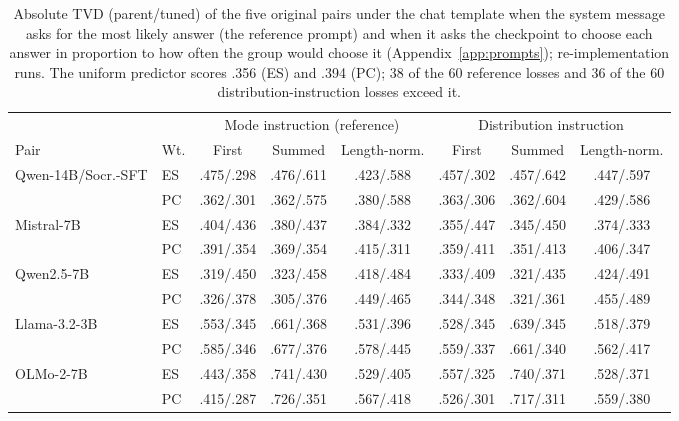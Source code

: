 \begin{table}[t]
\centering\scriptsize
\setlength{\tabcolsep}{4pt}
\begin{tabular}{@{}llcccccc@{}}
\toprule
& & \multicolumn{3}{c}{Mode instruction (reference)} & \multicolumn{3}{c}{Distribution instruction} \\
\cmidrule(lr){3-5}\cmidrule(l){6-8}
Pair & Wt. & First & Summed & Length-norm. & First & Summed & Length-norm. \\
\midrule
Qwen-14B/Socr.-SFT & ES & .475/.298 & .476/.611 & .423/.588 & .457/.302 & .457/.642 & .447/.597 \\
 & PC & .362/.301 & .362/.575 & .380/.588 & .363/.306 & .362/.604 & .429/.586 \\
Mistral-7B & ES & .404/.436 & .380/.437 & .384/.332 & .355/.447 & .345/.450 & .374/.333 \\
 & PC & .391/.354 & .369/.354 & .415/.311 & .359/.411 & .351/.413 & .406/.347 \\
Qwen2.5-7B & ES & .319/.450 & .323/.458 & .418/.484 & .333/.409 & .321/.435 & .424/.491 \\
 & PC & .326/.378 & .305/.376 & .449/.465 & .344/.348 & .321/.361 & .455/.489 \\
Llama-3.2-3B & ES & .553/.345 & .661/.368 & .531/.396 & .528/.345 & .639/.345 & .518/.379 \\
 & PC & .585/.346 & .677/.376 & .578/.445 & .559/.337 & .661/.340 & .562/.417 \\
OLMo-2-7B & ES & .443/.358 & .741/.430 & .529/.405 & .557/.325 & .740/.371 & .528/.371 \\
 & PC & .415/.287 & .726/.351 & .567/.418 & .526/.301 & .717/.311 & .559/.380 \\
\bottomrule
\end{tabular}
\caption{Absolute TVD (parent/tuned) of the five original pairs under the chat template when the system message asks for the most likely answer (the reference prompt) and when it asks the checkpoint to choose each answer in proportion to how often the group would choose it (Appendix~\ref{app:prompts}); re-implementation runs. The uniform predictor scores .356 (ES) and .394 (PC); 38 of the 60 reference losses and 36 of the 60 distribution-instruction losses exceed it.}
\label{tab:distribution-instruction}
\end{table}
